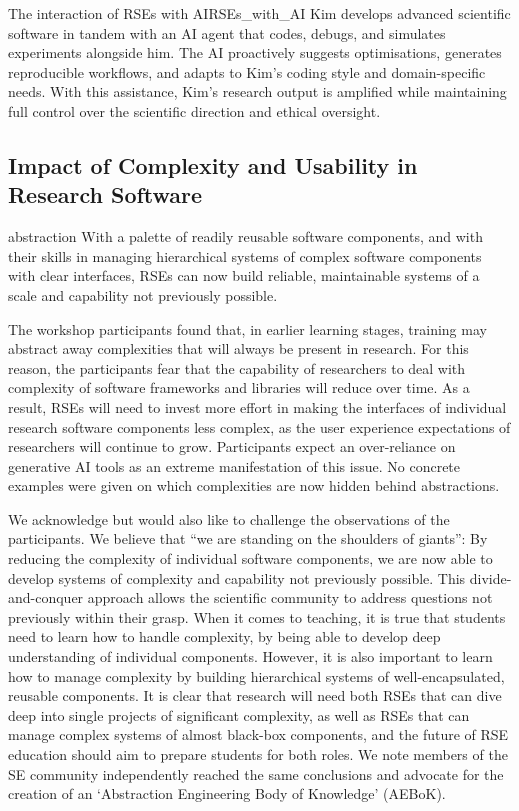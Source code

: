 \documentclass{eceasst}
\begin{document}
\begin{story}{The interaction of RSEs with AI}{RSEs_with_AI}
Kim develops advanced scientific software in tandem with an AI agent that codes,
debugs, and simulates experiments alongside him. The AI proactively suggests optimisations,
generates reproducible workflows, and adapts to Kim’s coding style and domain-specific needs.
With this assistance, Kim's research output is amplified while maintaining full control over the scientific direction and ethical oversight.
\end{story}

\subsection{Impact of Complexity and Usability in Research Software}
\label{sec:complexity}
\begin{whatis}{}{abstraction}
With a palette of readily reusable software components,
and with their skills in managing hierarchical systems of complex software components with clear interfaces,
RSEs can now build reliable, maintainable systems of a scale and capability not previously possible.
\end{whatis}

The workshop participants found that, in earlier learning stages,
training may abstract away complexities that will always be present in research.
For this reason, the participants fear that the capability of researchers to deal with complexity
of software frameworks and libraries will reduce over time.
As a result, RSEs will need to invest more effort in making the interfaces of individual research software components
less complex, as the user experience expectations of researchers will continue to grow.
Participants expect an over-reliance on generative AI tools as an extreme manifestation of this issue.
No concrete examples were given on which complexities are now hidden behind abstractions.

We acknowledge but would also like to challenge the observations of the participants.
We believe that ``we are standing on the shoulders of giants'':
By reducing the complexity of individual software components,
we are now able to develop systems of complexity and capability not previously possible.
This divide-and-conquer approach allows the scientific community to address questions not previously within their grasp.
When it comes to teaching, it is true that students need to learn how to handle complexity,
by being able to develop deep understanding of individual components.
However, it is also important to learn how to manage complexity
by building hierarchical systems of well-encapsulated, reusable components.
It is clear that research will need both RSEs that can dive deep into single projects of significant complexity,
as well as RSEs that can manage complex systems of almost black-box components,
and the future of RSE education should aim to prepare students for both roles.
We note members of the SE community independently reached the same conclusions
and advocate for the creation of an `Abstraction Engineering Body of Knowledge'
(AEBoK)\cite{Bencomo2024AEBoK}.
\end{document}
